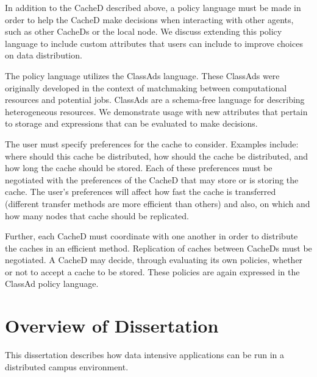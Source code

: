 In addition to the CacheD described above, a policy language must be made in order to help the CacheD make decisions when interacting with other agents, such as other CacheDs or the local node.  We discuss extending this policy language to include custom attributes that users can include to improve choices on data distribution.

The policy language utilizes the \mbox{ClassAds} \cite{raman1998matchmaking} language.  These \mbox{ClassAds} were originally developed in the context of matchmaking between computational resources and potential jobs.  ClassAds are a schema-free language for describing heterogeneous resources.  We demonstrate usage with new attributes that pertain to storage and expressions that can be evaluated to make decisions.

The user must specify preferences for the cache to consider.  Examples include: where should this cache be distributed, how should the cache be distributed, and how long the cache should be stored.  Each of these preferences must be negotiated with the preferences of the CacheD that may store or is storing the cache.  The user's preferences will affect how fast the cache is transferred (different transfer methods are more efficient than others) and also, on which and how many nodes that cache should be replicated.

Further, each CacheD must coordinate with one another in order to distribute the caches in an efficient method.  Replication of caches between CacheDs must be negotiated.  A CacheD may decide, through evaluating its own policies, whether or not to accept a cache to be stored.  These policies are again expressed in the ClassAd policy language.



\section{Overview of Dissertation}

This dissertation describes how data intensive applications can be run in a distributed campus environment.

